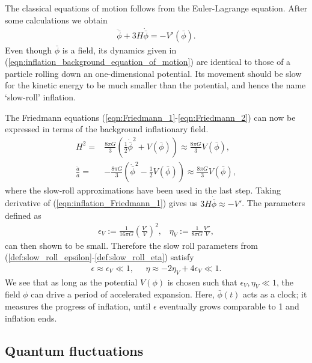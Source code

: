 The classical equations of motion follows from the Euler-Lagrange equation. After some calculations we obtain
\begin{align}
	\ddot{\bar{\phi}} + 3H\dot{\bar{\phi}} = - V'(\bar{\phi}). 	  \label{eqn:inflation_background_equation_of_motion}
\end{align}
Even though $\bar{\phi}$ is a field, its dynamics given in (\ref{eqn:inflation_background_equation_of_motion}) are identical to those of a particle rolling down an one-dimensional potential. Its movement should be slow for the kinetic energy to be much smaller than the potential, and hence the name `slow-roll' inflation.

The Friedmann equations (\ref{eqn:Friedmann_1}-\ref{eqn:Friedmann_2}) can now be expressed in terms of the background inflationary field.
\begin{align}
	H^2 =& \frac{8\pi G}{3} \left( \frac{1}{2} \dot{\bar{\phi}}^2 + V(\bar{\phi}) \right) \approx \frac{8\pi G}{3} V(\bar{\phi}), \label{eqn:inflation_Friedmann_1} \\
	\frac{\ddot{a}}{a} =& -\frac{8\pi G}{3} \left( \dot{\bar{\phi}}^2 - \frac{1}{2} V(\bar{\phi}) \right) \approx \frac{8\pi G}{3} V(\bar{\phi}), \label{eqn:inflation_Friedmann_2}
\end{align}
where the slow-roll approximations have been used in the last step. Taking derivative of (\ref{eqn:inflation_Friedmann_1}) gives us $3H\dot{\bar{\phi}} \approx -V'$. The parameters defined as
\begin{align}
	\epsilon_V := \frac{1}{16\pi G} \left( \frac{V'}{V} \right)^2, \;\;\;
	\eta_V := \frac{1}{8\pi G} \frac{V''}{V},
\end{align}
can then shown to be small. Therefore the slow roll parameters from (\ref{def:slow_roll_epsilon}-\ref{def:slow_roll_eta}) satisfy
\begin{align}
	\epsilon \approx \epsilon_V \ll 1, \;\;\;\;\; \eta \approx -2\eta_V + 4\epsilon_V \ll 1.
\end{align}
We see that as long as the potential $V(\phi)$ is chosen such that $\epsilon_V, \eta_V \ll 1$, the field $\phi$ can drive a period of accelerated expansion. Here, $\bar{\phi}(t)$ acts as a clock; it measures the progress of inflation, until $\epsilon$ eventually grows comparable to 1 and inflation ends.

\subsection{Quantum fluctuations} \label{section:quantum_fluctuations}

